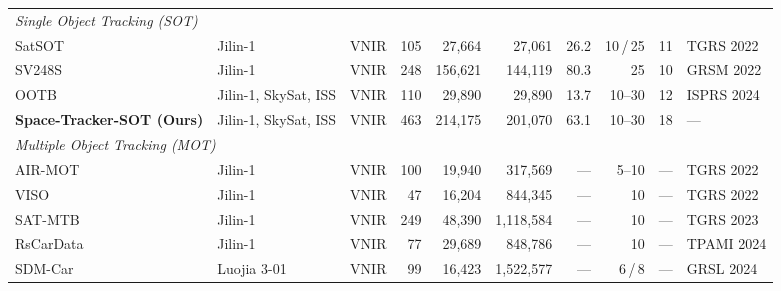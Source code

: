 \begin{table}[H]
{\begin{tabular}{l l l r r r r r r l}
\midrule
\multicolumn{10}{l}{\textit{Single Object Tracking (SOT)}} \\
SatSOT~\cite{satSOT2022}              & Jilin-1                      & VNIR & 105 &  27{,}664 &      27{,}061 & 26.2 &  10\,/\,25 & 11 & TGRS 2022  \\
SV248S~\cite{Li2022SV248S}            & Jilin-1                      & VNIR & 248 & 156{,}621 &     144{,}119 & 80.3 &  25 & 10 & GRSM 2022  \\
OOTB~\cite{CHEN2024212ootb}           & Jilin-1, SkySat, ISS         & VNIR & 110 &  29{,}890 &      29{,}890 & 13.7 &  10--30 & 12 & ISPRS 2024 \\
\textbf{Space-Tracker-SOT (Ours)}     & Jilin-1, SkySat, ISS         & VNIR & 463 & 214{,}175 &     201{,}070 & 63.1 &  10--30 & 18 & --- \\
\midrule
\multicolumn{10}{l}{\textit{Multiple Object Tracking (MOT)}} \\
AIR-MOT~\cite{He2022TGraM}            & Jilin-1                      & VNIR & 100 &  19{,}940 &     317{,}569 & --- & 5--10 & --- & TGRS 2022  \\
VISO~\cite{yin2021viso}               & Jilin-1                      & VNIR &  47 &  16{,}204 &     844{,}345 & --- & 10 & --- & TGRS 2022  \\
SAT-MTB~\cite{Li2023SATMTB}           & Jilin-1                      & VNIR & 249 &  48{,}390 &  1{,}118{,}584 & --- & 10 & --- & TGRS 2023  \\
RsCarData~\cite{Xiao2024HiEUM}        & Jilin-1                      & VNIR &  77 &  29{,}689 &     848{,}786 & --- & 10 & --- & TPAMI 2024 \\
SDM-Car~\cite{Zhang2024SDMCar}        & Luojia 3-01                  & VNIR &  99 &  16{,}423 &  1{,}522{,}577 & --- &  6\,/\,8 & --- & GRSL 2024  \\
\bottomrule
\end{tabular}%
}
\end{table}
